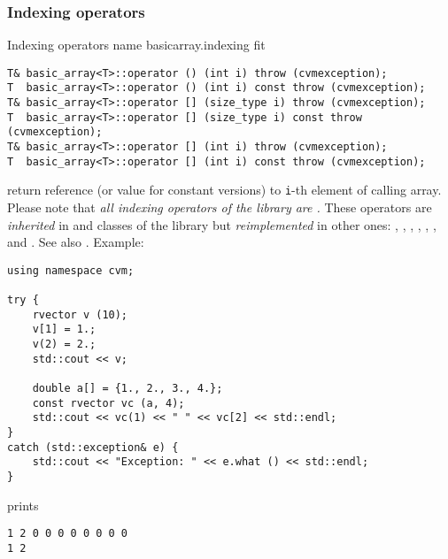 \subsubsection{Indexing operators}
Indexing operators%
\pdfdest name {basicarray.indexing} fit
\begin{verbatim}
T& basic_array<T>::operator () (int i) throw (cvmexception);
T  basic_array<T>::operator () (int i) const throw (cvmexception);
T& basic_array<T>::operator [] (size_type i) throw (cvmexception);
T  basic_array<T>::operator [] (size_type i) const throw (cvmexception);
T& basic_array<T>::operator [] (int i) throw (cvmexception);
T  basic_array<T>::operator [] (int i) const throw (cvmexception);
\end{verbatim}
return  reference (or value for constant versions)
to \verb"i"-th element of calling array. Please note that \emph{all indexing 
operators of the library are \Based.}
These operators are \emph{inherited} in 
 and  
classes of the library but \emph{reimplemented} in other ones:
,   ,
, ,
, ,
 and .
See also .
Example:
\begin{Verbatim}
using namespace cvm;

try {
    rvector v (10);
    v[1] = 1.;
    v(2) = 2.;
    std::cout << v;

    double a[] = {1., 2., 3., 4.};
    const rvector vc (a, 4);
    std::cout << vc(1) << " " << vc[2] << std::endl;
}
catch (std::exception& e) {
    std::cout << "Exception: " << e.what () << std::endl;
}
\end{Verbatim}
prints
\begin{Verbatim}
1 2 0 0 0 0 0 0 0 0
1 2
\end{Verbatim}
\newpage


